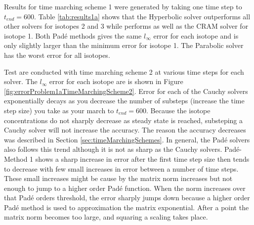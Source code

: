 Results for time marching scheme 1 were generated by taking one time step to $t_{end} = 600$. Table \ref{tab:results1a} shows that the Hyperbolic solver outperforms all other solvers for isotopes 2 and 3 while performs as well as the CRAM solver for isotope 1. Both Pad\'e methods gives the same $l_{\infty}$ error for each isotope and is only slightly larger than the minimum error for isotope 1. The Parabolic solver has the worst error for all isotopes. 

Test are conducted with time marching scheme 2 at various time steps for each solver. The $l_{\infty}$ error for each isotope are is shown in Figure \ref{fig:errorProblem1aTimeMarchingScheme2}. Error for each of the Cauchy solvers exponentially decays as you decrease the number of substeps (increase the time step size) you take as your march to $t_{end}=600$. Because the isotope concentrations do not sharply decrease as steady state is reached, substeping a Cauchy solver will not increase the accuracy. The reason the accuracy decreases was described in Section \ref{sec:timeMarchingSchemes}. In general, the Pad\'e solvers also follows this trend although it is not as sharp as the Cauchy solvers. Pad\'e-Method 1 shows a sharp increase in error after the first time step size then tends to decrease with few small increases in error between a number of time steps. These small increases might be cause by the matrix norm increases but not enough to jump to a higher order Pad\'e function. When the norm increases over that Pad\'e orders threshold, the error sharply jumps down because a higher order Pad\'e method is used to approximation the matrix exponential. After a point the matrix norm becomes too large, and squaring a scaling takes place. 


